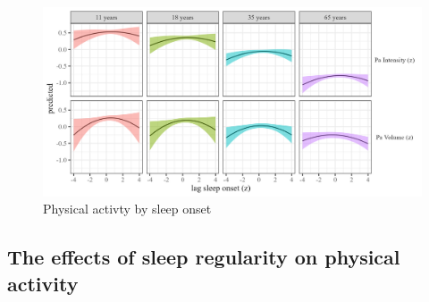 \documentclass[
  man]{apa6}
\begin{document}
\begin{figure}
\includegraphics[width=7.08in]{../Figures/Pa on sleep_onset_lag} \caption{Physical activty by sleep onset}\label{fig:PA-by-sleep-onset-fig}
\end{figure}

\hypertarget{the-effects-of-sleep-regularity-on-physical-activity}{%
\subsection{The effects of sleep regularity on physical activity}\label{the-effects-of-sleep-regularity-on-physical-activity}}
\end{document}
